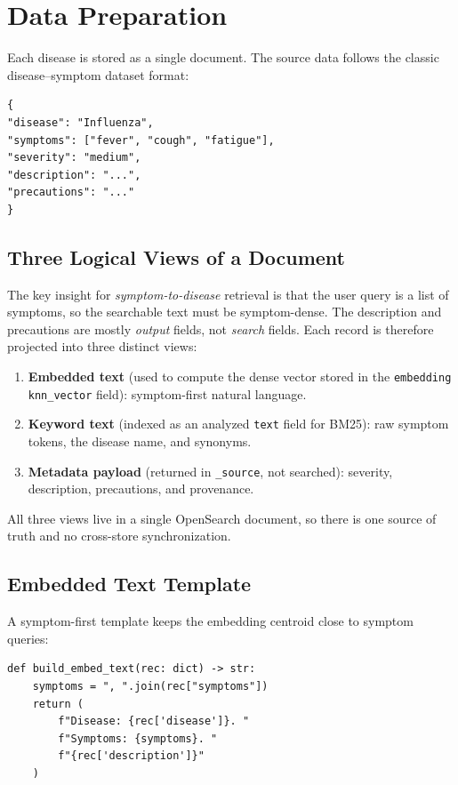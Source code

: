\documentclass[11pt,a4paper]{article}
\begin{document}
\section{Data Preparation}

Each disease is stored as a single document. The source data follows the
classic disease--symptom dataset format:

\begin{lstlisting}[basicstyle=\ttfamily\small]
{
"disease": "Influenza",
"symptoms": ["fever", "cough", "fatigue"],
"severity": "medium",
"description": "...",
"precautions": "..."
}
\end{lstlisting}

\subsection{Three Logical Views of a Document}

The key insight for \emph{symptom-to-disease} retrieval is that the user query
is a list of symptoms, so the searchable text must be symptom-dense. The
description and precautions are mostly \emph{output} fields, not \emph{search}
fields. Each record is therefore projected into three distinct views:

\begin{enumerate}
    \item \textbf{Embedded text} (used to compute the dense vector stored in the
          \texttt{embedding} \texttt{knn\_vector} field): symptom-first natural
          language.
    \item \textbf{Keyword text} (indexed as an analyzed \texttt{text} field for
          BM25): raw symptom tokens, the disease name, and synonyms.
    \item \textbf{Metadata payload} (returned in \texttt{\_source}, not searched):
          severity, description, precautions, and provenance.
\end{enumerate}

All three views live in a single OpenSearch document, so there is one source of
truth and no cross-store synchronization.

\subsection{Embedded Text Template}

A symptom-first template keeps the embedding centroid close to symptom queries:

\begin{lstlisting}[basicstyle=\ttfamily\small]
def build_embed_text(rec: dict) -> str:
    symptoms = ", ".join(rec["symptoms"])
    return (
        f"Disease: {rec['disease']}. "
        f"Symptoms: {symptoms}. "
        f"{rec['description']}"
    )
\end{lstlisting}
\end{document}
